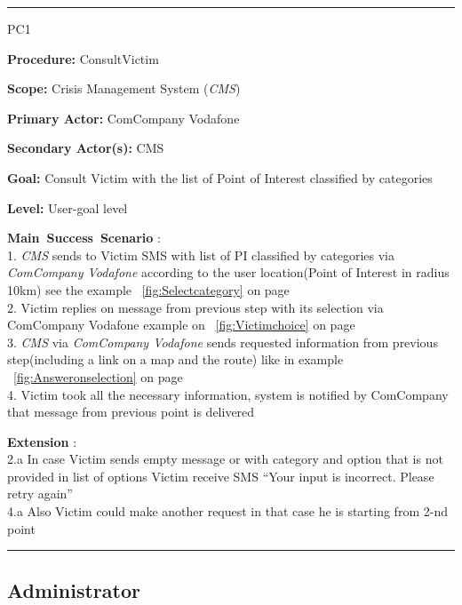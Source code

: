 \vspace{0.5cm}
\hrule
\begin{lyxlist}{PC1}
\small{
\item [\textbf{Procedure:}] ConsultVictim
\item [\textbf{Scope:}] Crisis Management System (\emph{CMS})
\item [\textbf{Primary Actor:}] ComCompany Vodafone
\item [\textbf{Secondary Actor(s):}] CMS
\item [\textbf{Goal:}] Consult Victim with the list of Point of Interest
classified by categories
\item [\textbf{Level:}] User-goal level 

\item [\textbf{Main~Success~Scenario}]:\\
1. \emph{CMS} sends to Victim SMS with list of PI classified by categories via
\emph{ComCompany Vodafone} according to the user location(Point of Interest in radius 10km) see the example ~\ref{fig:Selectcategory} on page~\pageref{fig:Selectcategory}\\
2. Victim replies on message from previous step with its selection via
ComCompany Vodafone example on ~\ref{fig:Victimchoice} on page~\pageref{fig:Victimchoice}\\
3. \emph{CMS} via \emph{ComCompany Vodafone} sends requested information from
previous step(including a link on a map and the route) like in example ~\ref{fig:Answeronselection} on page~\pageref{fig:Answeronselection}\\
4. Victim took all the necessary information, system is notified by ComCompany 
that message from previous point is delivered\\

\item [\textbf{Extension}]:\\ 
2.a In case Victim sends empty message or with category and option that is not
provided in list of options Victim receive SMS ``Your input is incorrect. Please
retry again''\\
4.a Also Victim could make another request in that case he is starting from 2-nd
point\\
}
\end{lyxlist}
\hrule
\vspace{0.5cm}

\subsection{Administrator}

